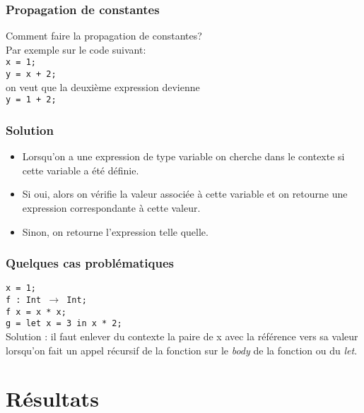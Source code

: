 \documentclass{beamer}
\begin{document}
\begin{frame}
\frametitle{Propagation de constantes}
Comment faire la propagation de constantes?\\
Par exemple sur le code suivant:\\
\bigskip
\quad\texttt{x = 1;}\\
\quad\texttt{y = x + 2;}\\
\bigskip
on veut que la deuxième expression devienne \\
\quad\texttt{y = 1 + 2;}\\

\end{frame}
\begin{frame}
\frametitle{Solution}
    \begin{itemize}
        \item Lorsqu'on a une expression de type variable on cherche dans le contexte si cette variable a été définie.
        \item Si oui, alors on vérifie la valeur associée à cette variable et on retourne une expression correspondante à cette valeur.
        \item Sinon, on retourne l'expression telle quelle.
    \end{itemize}
\end{frame}
\begin{frame}
    \frametitle{Quelques cas problématiques}
    \texttt{x = 1;} \\
    \bigskip
    \texttt{f : Int $\rightarrow$ Int;\\
    f x = x * x;}\\
    \bigskip
    \texttt{g = let x = 3 in x * 2;}\\
    \bigskip
    Solution : il faut enlever du contexte la paire de x avec la référence vers sa valeur lorsqu'on fait un appel récursif de la fonction sur le \emph{body} de la fonction ou du \emph{let}.
\end{frame}
\section{Résultats}
\end{document}

